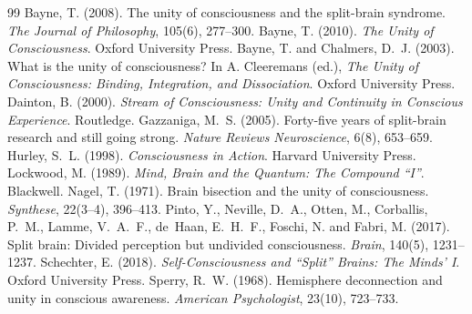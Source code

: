 \documentclass{situationist-preprint}
\begin{document}
\begin{thebibliography}{99}\small
{} Bayne, T. (2008). The unity of consciousness and the split-brain syndrome. \emph{The Journal of Philosophy}, 105(6), 277--300.
 Bayne, T. (2010). \emph{The Unity of Consciousness}. Oxford University Press.
 Bayne, T. and Chalmers, D.~J. (2003). What is the unity of consciousness? In A. Cleeremans (ed.), \emph{The Unity of Consciousness: Binding, Integration, and Dissociation}. Oxford University Press.
 Dainton, B. (2000). \emph{Stream of Consciousness: Unity and Continuity in Conscious Experience}. Routledge.
 Gazzaniga, M.~S. (2005). Forty-five years of split-brain research and still going strong. \emph{Nature Reviews Neuroscience}, 6(8), 653--659.
 Hurley, S.~L. (1998). \emph{Consciousness in Action}. Harvard University Press.
 Lockwood, M. (1989). \emph{Mind, Brain and the Quantum: The Compound \enquote{I}}. Blackwell.
 Nagel, T. (1971). Brain bisection and the unity of consciousness. \emph{Synthese}, 22(3--4), 396--413.
 Pinto, Y., Neville, D.~A., Otten, M., Corballis, P.~M., Lamme, V.~A.~F., de~Haan, E.~H.~F., Foschi, N. and Fabri, M. (2017). Split brain: Divided perception but undivided consciousness. \emph{Brain}, 140(5), 1231--1237.
 Schechter, E. (2018). \emph{Self-Consciousness and \enquote{Split} Brains: The Minds' I}. Oxford University Press.
 Sperry, R.~W. (1968). Hemisphere deconnection and unity in conscious awareness. \emph{American Psychologist}, 23(10), 723--733.
\end{thebibliography}
\end{document}

